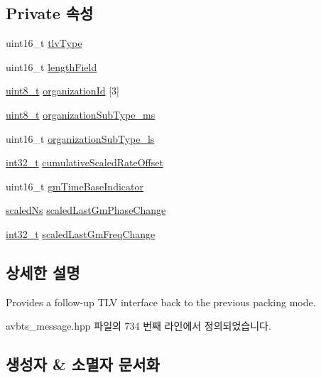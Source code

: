 \subsection*{Private 속성}
\begin{DoxyCompactItemize}
\item 
uint16\+\_\+t \hyperlink{class_follow_up_t_l_v_a90baf0e86e13da82746e3aab1436388b}{tlv\+Type}
\item 
uint16\+\_\+t \hyperlink{class_follow_up_t_l_v_a4dc83d7a14b4ddc8ba6051ab20ddcf1a}{length\+Field}
\item 
\hyperlink{stdint_8h_aba7bc1797add20fe3efdf37ced1182c5}{uint8\+\_\+t} \hyperlink{class_follow_up_t_l_v_a30511459852792f2f0e687625d99530f}{organization\+Id} \mbox{[}3\mbox{]}
\item 
\hyperlink{stdint_8h_aba7bc1797add20fe3efdf37ced1182c5}{uint8\+\_\+t} \hyperlink{class_follow_up_t_l_v_aaad8acec162fb623707af758bc49f425}{organization\+Sub\+Type\+\_\+ms}
\item 
uint16\+\_\+t \hyperlink{class_follow_up_t_l_v_af5d5d56c0c74e3df1cae99986fafa44b}{organization\+Sub\+Type\+\_\+ls}
\item 
\hyperlink{parse_8c_a37994e3b11c72957c6f454c6ec96d43d}{int32\+\_\+t} \hyperlink{class_follow_up_t_l_v_adfe06759e054a6c0f89334cfe862a00d}{cumulative\+Scaled\+Rate\+Offset}
\item 
uint16\+\_\+t \hyperlink{class_follow_up_t_l_v_a2b7eb6d70b022660d9a9aad9bb7be333}{gm\+Time\+Base\+Indicator}
\item 
\hyperlink{classscaled_ns}{scaled\+Ns} \hyperlink{class_follow_up_t_l_v_a45a0857a47dc527dd3b7975551f69333}{scaled\+Last\+Gm\+Phase\+Change}
\item 
\hyperlink{parse_8c_a37994e3b11c72957c6f454c6ec96d43d}{int32\+\_\+t} \hyperlink{class_follow_up_t_l_v_a54e300bc3a15ef8e662516094953bad4}{scaled\+Last\+Gm\+Freq\+Change}
\end{DoxyCompactItemize}


\subsection{상세한 설명}
Provides a follow-\/up T\+LV interface back to the previous packing mode. 

avbts\+\_\+message.\+hpp 파일의 734 번째 라인에서 정의되었습니다.



\subsection{생성자 \& 소멸자 문서화}
